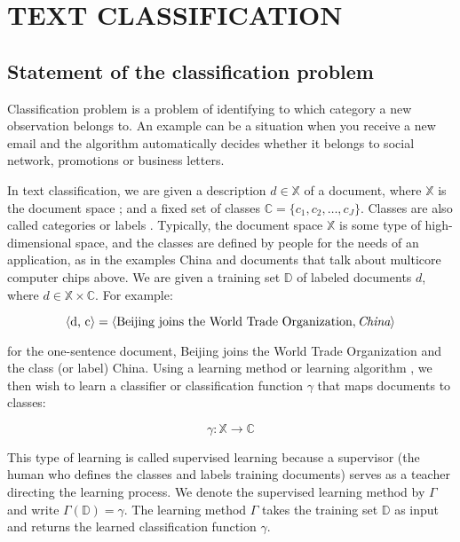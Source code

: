\chapter{TEXT CLASSIFICATION} \label{chapt1}
\section{Statement of the classification problem} \label{sect1_2}


Classification problem is a problem of identifying to which category a new observation belongs to. An example can be a situation when you receive a new email and the algorithm automatically decides whether it belongs to social network, promotions or business letters.


\newcommand{\docsetlabeled}{\mathbb{D}}

In text classification, we are given a description  $d \in \mathbb{X}$ of a document, where $\mathbb{X}$ is the document space ; and a fixed set of classes  $\mathbb{C} = \{ c_1,c_2,\ldots,c_J \}$. Classes are also called categories or labels . Typically, the document space  $\mathbb{X}$ is some type of high-dimensional space, and the classes are defined by people for the needs of an application, as in the examples China and documents that talk about multicore computer chips above. We are given a training set  $\docsetlabeled$ of labeled documents  $d $, where  $d \in \mathbb{X} \times \mathbb{C}$. For example: 

\begin{equation}
\label{eq:equation3}
\langle\mbox{d, c}\rangle=\langle\mbox{Beijing joins the World Trade Organization}, \emph{China}\rangle
\end{equation}

for the one-sentence document, Beijing joins the World Trade Organization and the class (or label) China.
Using a learning method or learning algorithm , we then wish to learn a classifier or classification function  $\gamma $ that maps documents to classes:

\begin{equation}
\label{eq:equation4}
\gamma: \mathbb{X} \rightarrow \mathbb{C}
\end{equation}

This type of learning is called supervised learning because a supervisor (the human who defines the classes and labels training documents) serves as a teacher directing the learning process. We denote the supervised learning method by $\Gamma$ and write  $\Gamma(\docsetlabeled) = \gamma$. The learning method $\Gamma$ takes the training set  $\docsetlabeled$ as input and returns the learned classification function $\gamma $.

